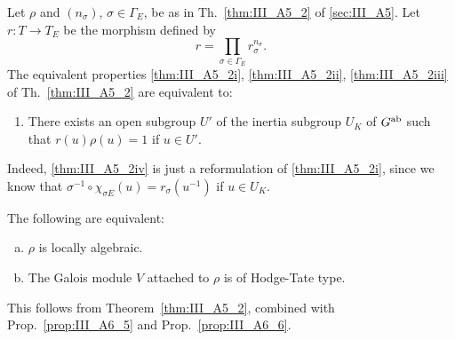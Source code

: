 \begin{subappendices}
\begin{prop}\label{prop:III_A6_6}
	Let $\rho$ and $(n_\sigma)$, $\sigma \in \Gamma_E$, be as in
	Th.~\ref{thm:III_A5_2} of \ref{sec:III_A5}.  Let $r\colon T \to T_E$ be
	the morphism defined by
	\[
		r = \prod_{\sigma \in \Gamma_E} r_\sigma^{n_\sigma}.
	\]
	The equivalent properties \ref{thm:III_A5_2i}, \ref{thm:III_A5_2ii},
	\dpage
	\ref{thm:III_A5_2iii} of Th.~\ref{thm:III_A5_2} are equivalent to:
	\begin{enumerate}[resume*=thm_IIIA5_2]
	\item\label{thm:III_A5_2iv}
		There exists an open subgroup $U'$ of the inertia subgroup
		$U_K$ of $G^{\mathrm{ab}}$ such that $r(u) \rho(u) = 1$ if $u \in U'$.
	\end{enumerate}
\end{prop}
Indeed, \ref{thm:III_A5_2iv} is just a reformulation of \ref{thm:III_A5_2i},
since we know that $\sigma^{-1} \circ \chi_{\sigma E}(u) = r_\sigma(u^{-1})$ if
$u \in U_K$.

\begin{corp}
	The following are equivalent:
	\begin{enumerate}[(a)]
	\item $\rho$ is locally algebraic.
	\item The Galois module $V$ attached to $\rho$ is of Hodge-Tate type.
	\end{enumerate}
\end{corp}
This follows from Theorem~\ref{thm:III_A5_2}, combined with
Prop.~\ref{prop:III_A6_5} and Prop.~\ref{prop:III_A6_6}.


\end{subappendices}
